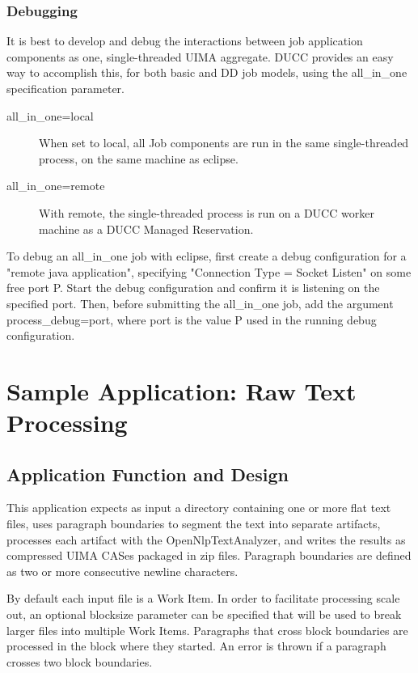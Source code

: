 \subsection{Debugging}
It is best to develop and debug the interactions between job application components as one, 
single-threaded UIMA aggregate. DUCC provides an easy way to accomplish this, for both basic
and DD job models, using the all\_in\_one specification parameter.

\begin{description}
    \item[all\_in\_one=local] When set to local, all Job components are run in the same
      single-threaded process, on the same machine as eclipse.
    \item[all\_in\_one=remote] With remote, the single-threaded process is run on a DUCC
      worker machine as a DUCC Managed Reservation. 
\end{description}

To debug an all\_in\_one job with eclipse, first create a debug configuration for a
"remote java application", specifying "Connection Type = Socket Listen" on some
free port P. Start the debug configuration and confirm it is listening on the specified port.
Then, before submitting the all\_in\_one job, add the argument process\_debug=port, 
where port is the value P used in the running debug configuration.


\chapter{Sample Application: Raw Text Processing}

\section{Application Function and Design}
This application expects as input a directory containing one or more flat text files, 
uses paragraph boundaries to segment the text into separate artifacts, 
processes each artifact with the OpenNlpTextAnalyzer, and writes
the results as compressed UIMA CASes packaged in zip files. Paragraph boundaries are defined as
two or more consecutive newline characters.

By default each input file is a Work Item. In order to facilitate processing scale out, 
an optional blocksize parameter can be specified that will be used to break larger 
files into multiple Work Items. Paragraphs that cross block boundaries are processed
in the block where they started. An error is thrown if a paragraph crosses two block
boundaries.


